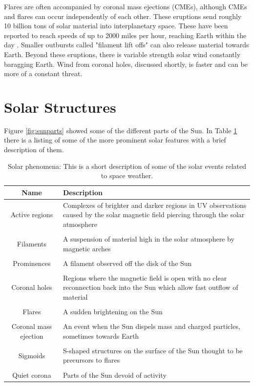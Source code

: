 \documentclass[twoside]{report}
\begin{document}
Flares are often accompanied by coronal mass ejections (CMEs), although CMEs and flares can occur independently of each other. These eruptions send roughly 10 billion tons of solar material into interplanetary space. These have been reported to reach speeds of up to 2000 miles per hour, reaching Earth within the day \cite{fastcme}. Smaller outbursts called "filament lift offs" can also release material towards Earth. Beyond these eruptions, there is variable strength solar wind constantly baragging Earth. Wind from coronal holes, discussed shortly, is faster and can be more of a constant threat. 

\section{Solar Structures}\label{sec:solarstruct}
Figure \ref{fig:sunparts} showed some of the different parts of the Sun. In Table \ref{tab:solarfeatures} there is a listing of some of the more prominent solar features with a brief description of them. 

\begin{table}[ht!]
\centering
 \begin{tabular}{||c m{}||} 
 \hline
 Name & Description \\
   \hline\hline
   Active regions & Complexes of brighter and darker regions in UV observations caused by the solar magnetic field piercing through the solar atmosphere \\ \hline \\
   Filaments & A suspension of material high in the solar atmosphere by magnetic arches\\ \hline \\
   Prominences & A filament observed off the disk of the Sun \\ \hline \\
   Coronal holes & Regions where the magnetic field is open with no clear reconnection back into the Sun which allow fast outflow of material \\ \hline \\
   Flares & A sudden brightening on the Sun \\ \hline \\
   Coronal mass ejection & An event when the Sun dispels mass and charged particles, sometimes towards Earth \\ \hline \\
   Sigmoids & S-shaped structures on the surface of the Sun thought to be precursors to flares \\ \hline \\
   Quiet corona & Parts of the Sun devoid of activity \\ 
 \hline
 \end{tabular}
 \caption{Solar phenomena: This is a short description of some of the solar events related to space weather. }
 \label{tab:solarfeatures}
\end{table}
\end{document}
